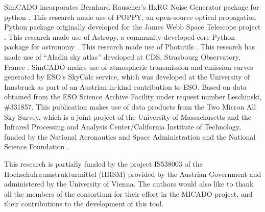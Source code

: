 \begin{acknowledgements}

SimCADO incorporates Bernhard Rauscher's HxRG Noise Generator package for python \citep{nghxrg}. 
This research made use of POPPY, an open-source optical propagation Python package originally developed for the James Webb Space Telescope project \citep{poppy}. 
This research made use of Astropy, a community-developed core Python package for astronomy \citep{astropy, astropy2}. 
This research made use of Photutils \citep{photutils}. 
This research has made use of ``Aladin sky atlas'' developed at CDS, Strasbourg Observatory, France \citep{aladin, aladinlite}.
SimCADO makes use of atmospheric transmission and emission curves generated by ESO's SkyCalc service, which was developed at the University of Innsbruck as part of an Austrian in-kind contribution to ESO. 
Based on data obtained from the ESO Science Archive Facility under request number Leschinski, \#331857.
This publication makes use of data products from the Two Micron All Sky Survey, which is a joint project of the University of Massachusetts and the Infrared Processing and Analysis Center/California Institute of Technology, funded by the National Aeronautics and Space Administration and the National Science Foundation \citep{2mass}.

This research is partially funded by the project IS538003 of the Hochschulraumstrukturmittel (HRSM) provided by the Austrian Government and administered by the University of Vienna. The authors would also like to thank all the members of the consortium for their effort in the MICADO project, and their contributions to the development of this tool.


\end{acknowledgements}